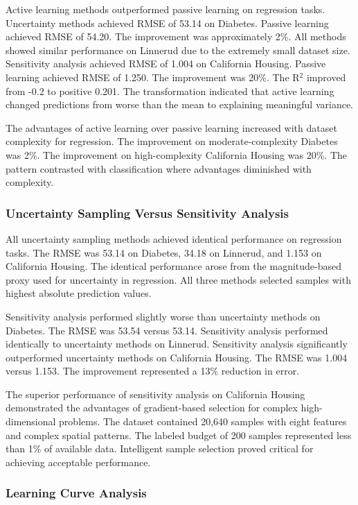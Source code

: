 \documentclass[conference]{IEEEtran}
\begin{document}
Active learning methods outperformed passive learning on regression tasks. Uncertainty methods achieved RMSE of 53.14 on Diabetes. Passive learning achieved RMSE of 54.20. The improvement was approximately 2\%. All methods showed similar performance on Linnerud due to the extremely small dataset size. Sensitivity analysis achieved RMSE of 1.004 on California Housing. Passive learning achieved RMSE of 1.250. The improvement was 20\%. The R$^2$ improved from -0.2 to positive 0.201. The transformation indicated that active learning changed predictions from worse than the mean to explaining meaningful variance.

The advantages of active learning over passive learning increased with dataset complexity for regression. The improvement on moderate-complexity Diabetes was 2\%. The improvement on high-complexity California Housing was 20\%. The pattern contrasted with classification where advantages diminished with complexity.

\subsubsection{Uncertainty Sampling Versus Sensitivity Analysis}

All uncertainty sampling methods achieved identical performance on regression tasks. The RMSE was 53.14 on Diabetes, 34.18 on Linnerud, and 1.153 on California Housing. The identical performance arose from the magnitude-based proxy used for uncertainty in regression. All three methods selected samples with highest absolute prediction values.

Sensitivity analysis performed slightly worse than uncertainty methods on Diabetes. The RMSE was 53.54 versus 53.14. Sensitivity analysis performed identically to uncertainty methods on Linnerud. Sensitivity analysis significantly outperformed uncertainty methods on California Housing. The RMSE was 1.004 versus 1.153. The improvement represented a 13\% reduction in error.

The superior performance of sensitivity analysis on California Housing demonstrated the advantages of gradient-based selection for complex high-dimensional problems. The dataset contained 20,640 samples with eight features and complex spatial patterns. The labeled budget of 200 samples represented less than 1\% of available data. Intelligent sample selection proved critical for achieving acceptable performance.

\subsubsection{Learning Curve Analysis}
\end{document}
